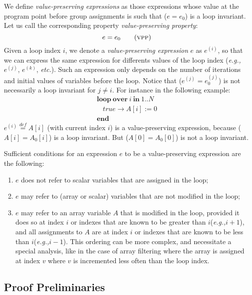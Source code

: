 \documentclass[a4paper,10pt]{article}
\newcommand{\eg}{\textit{e.g.,}\xspace}
\newcommand{\etc}{\textit{etc.}\xspace}
\newcommand{\idx}{\ensuremath{i}\xspace}
\newcommand{\KWloop}{\ensuremath{\mathrm{\textbf{loop}}~}}
\newcommand{\KWend}{\ensuremath{\mathrm{\textbf{end}}~}}
\newcommand{\KWover}{\ensuremath{\mathrm{\textbf{over}}~}}
\newcommand{\KWin}{\ensuremath{~\mathrm{\textbf{in}}~}}
\newcommand{\at}[1]{{(#1)}}
\newcommand{\symdef}{\ensuremath{\overset{\mathit{def}}{=}}}
\newcommand{\vpp}{\textsc{vpp}\xspace}
\begin{document}
We define \textit{value-preserving expressions} as those expressions whose
value at the program point before group assignments is such that ($e=e_0$) 
is a loop invariant. Let us call the corresponding property
\textit{value-preserving property}:
\begin{equation}
 e=e_0 \tag{\vpp}
\end{equation}
Given a loop index \idx, we denote a \textit{value-preserving expression} $e$
as $e^\at{\idx}$, so that we can express the same expression for differents
values of the loop index (\eg $e^\at{j}$, $e^\at{k}$, \etc). Such an expression
only depends on the number of iterations and initial values of variables
before the loop. Notice that ($e^\at{j} = e_0^\at{j}$) is not necessarily a
loop invariant for $j \neq i$.  For instance in the following example:
$$\begin{array}{l}
  \KWloop \KWover i \KWin 1 .. N \\
  ~~~~ \mathit{true} \rightarrow A[i] := 0\\
  \KWend
\end{array}$$
$e^\at{\idx} \symdef A[\idx]$ (with current index \idx) is a 
value-preserving expression, because ($A[\idx]=A_0[\idx]$) is a loop 
invariant. But ($A[0]=A_0[0]$) is not a loop invariant.

Sufficient conditions for an expression $e$ to be a value-preserving expression
are the following:
\begin{enumerate}
\item $e$ does not refer to scalar variables that are assigned in the loop;
\item $e$ may refer to (array or scalar) variables that are not modified in the loop;
\item $e$ may refer to an array variable $A$ that is modified in the loop,
  provided it does so at index \idx or indexes that are known to be greater
  than \idx (\eg $\idx + 1$), and all assignments to $A$ are at index \idx or
  indexes that are known to be less than \idx (\eg $\idx - 1$). This ordering
  can be more complex, and necessitate a special analysis, like in the case of
  array filtering where the array is assigned at index $v$ where $v$ is
  incremented less often than the loop index.
\end{enumerate}

\subsection{Proof Preliminaries}
\label{sec:Proof-Pre}
\end{document}
